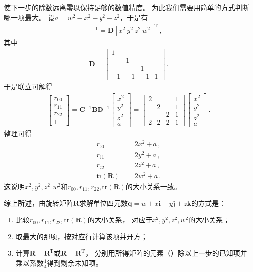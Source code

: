 使下一步的除数远离零以保持足够的数值精度。
为此我们需要用简单的方式判断哪一项最大。
设$a=w^2-x^2-y^2-z^2$，于是有
\begin{align}
    [x^2\ y^2\ z^2\ a]^\mathrm{T}=\bm D[x^2\ y^2\ z^2\ w^2]^\mathrm{T}\, ,
\end{align}
其中
\begin{align}
    \bm D=\left[\begin{array}{rrrr}
            1  &    &    &   \\
               & 1  &    &   \\
               &    & 1  &   \\
            -1 & -1 & -1 & 1
        \end{array}\right]\, .
\end{align}
于是联立可解得
\begin{align}
    \left[\begin{array}{c}
            r_{00} \\r_{11}\\r_{22}\\1
        \end{array}\right]=\bm C^{-1}\bm B\bm D^{-1}\left[\begin{array}{c}
            x^2 \\ y^2\\ z^2\\ a
        \end{array}\right]=\left[\begin{array}{cccc}
            2 &   &   & 1 \\
              & 2 &   & 1 \\
              &   & 2 & 1 \\
            2 & 2 & 2 & 1
        \end{array}\right]\left[\begin{array}{c}
            x^2 \\ y^2\\ z^2\\ a
        \end{array}\right]\, .
\end{align}
整理可得
\begin{align}
    r_{00}             & =2x^2+a\, , \\
    r_{11}             & =2y^2+a\, , \\
    r_{22}             & =2z^2+a\, , \\
    \mathrm{tr}(\bm R) & =2w^2+a\, .
\end{align}
这说明$x^2,y^2,z^2,w^2$和$r_{00},r_{11},r_{22},\mathrm{tr}(\bm R)$的大小关系一致。

综上所述，由旋转矩阵$\bm R$求解单位四元数$\bm q=w+x\mathbf{i}+y\mathbf{j}+z\mathbf{k}$的方式是：
\begin{enumerate}
    \item 比较$r_{00},r_{11},r_{22},\mathrm{tr}(\bm R)$的大小关系，
          对应于$x^2,y^2,z^2,w^2$的大小关系；
    \item 取最大的那项，按对应行计算该项并开方；
    \item 计算$\bm R-\bm R^\mathrm{T}$或$\bm R+\bm R^\mathrm{T}$，
          分别用所得矩阵的元素（）除以上一步的已知项并乘以系数$\displaystyle\frac{1}{4}$得到剩余未知项。
\end{enumerate}